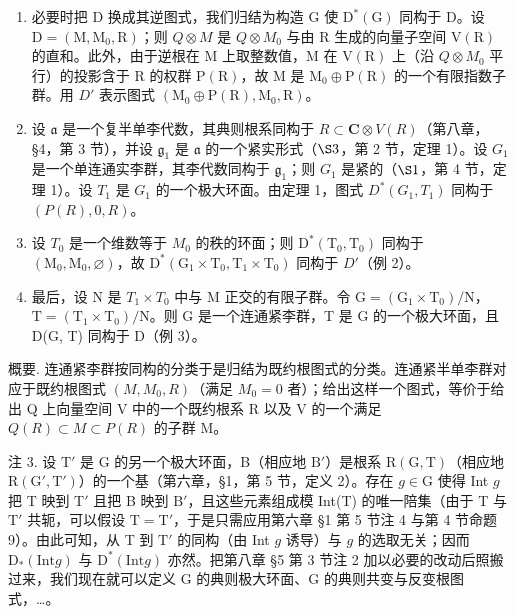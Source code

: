 \begin{enumerate}
\def\labelenumi{\alph{enumi})}
\item
  必要时把 D 换成其逆图式，我们归结为构造 G 使 \(\mathrm{D}^{*}(\mathrm{G})\) 同构于 D。设 \(\mathrm{D} = (\mathrm{M}, \mathrm{M}_{0}, \mathrm{R})\)；则 \(Q \otimes M\) 是 \(Q \otimes M_{0}\) 与由 R 生成的向量子空间 \(\mathrm{V}(\mathrm{R})\) 的直和。此外，由于逆根在 M 上取整数值，M 在 \(\mathrm{V}(\mathrm{R})\) 上（沿 \(Q \otimes M_{0}\) 平行）的投影含于 R 的权群 \(\mathrm{P}(\mathrm{R})\)，故 M 是 \(\mathrm{M}_{0} \oplus \mathrm{P}(\mathrm{R})\) 的一个有限指数子群。用 \(D'\) 表示图式 \((\mathrm{M}_{0} \oplus \mathrm{P}(\mathrm{R}), \mathrm{M}_{0}, \mathrm{R})\)。
\item
  设 \(\mathfrak{a}\) 是一个复半单李代数，其典则根系同构于 \(R \subset \mathbf{C} \otimes V(R)\)（第八章，§4，第 3 节），并设 \(\mathfrak{g}_1\) 是 \(\mathfrak{a}\) 的一个紧实形式（\(\S 3\)，第 2 节，定理 1）。设 \(G_1\) 是一个单连通实李群，其李代数同构于 \(\mathfrak{g}_1\)；则 \(G_1\) 是紧的（\(\S 1\)，第 4 节，定理 1）。设 \(T_1\) 是 \(G_1\) 的一个极大环面。由定理 1，图式 \(D^*(G_1, T_1)\) 同构于 \((P(R), 0, R)\)。
\item
  设 \(T_{0}\) 是一个维数等于 \(M_{0}\) 的秩的环面；则 \(\mathrm{D}^{*}(\mathrm{T}_{0},\mathrm{T}_{0})\) 同构于 \((\mathrm{M}_{0},\mathrm{M}_{0},\varnothing)\)，故 \(\mathrm{D}^{*}(\mathrm{G}_{1}\times\mathrm{T}_{0},\mathrm{T}_{1}\times\mathrm{T}_{0})\) 同构于 \(D'\)（例 2）。
\item
  最后，设 N 是 \(T_{1} \times T_{0}\) 中与 M 正交的有限子群。令 \(\mathrm{G} = (\mathrm{G}_{1} \times \mathrm{T}_{0})/\mathrm{N}\)，\(\mathrm{T} = (\mathrm{T}_{1} \times \mathrm{T}_{0})/\mathrm{N}\)。则 G 是一个连通紧李群，T 是 G 的一个极大环面，且 D(G, T) 同构于 D（例 3）。
\end{enumerate}

概要. 连通紧李群按同构的分类于是归结为既约根图式的分类。连通紧半单李群对应于既约根图式 \((M, M_{0}, R)\)（满足 \(M_{0} = 0\) 者）；给出这样一个图式，等价于给出 Q 上向量空间 V 中的一个既约根系 R 以及 V 的一个满足 \(Q(R) \subset M \subset P(R)\) 的子群 M。

注 3. 设 \(\mathrm{T}'\) 是 G 的另一个极大环面，B（相应地 \(\mathrm{B}'\)）是根系 \(\mathrm{R}(\mathrm{G},\mathrm{T})\)（相应地 \(\mathrm{R}(\mathrm{G}',\mathrm{T}')\)）的一个基（第六章，§1，第 5 节，定义 2）。存在 \(g\in \mathrm{G}\) 使得 Int \(g\) 把 T 映到 \(\mathrm{T}'\) 且把 B 映到 \(\mathrm{B}'\)，且这些元素组成模 Int(T) 的唯一陪集（由于 T 与 \(\mathrm{T}'\) 共轭，可以假设 \(\mathrm{T} = \mathrm{T}'\)，于是只需应用第六章 §1 第 5 节注 4 与第 4 节命题 9）。由此可知，从 T 到 \(\mathrm{T}'\) 的同构（由 Int \(g\) 诱导）与 \(g\) 的选取无关；因而 \(\mathrm{D}_{*}(\mathrm{Int}g)\) 与 \(\mathrm{D}^{*}(\mathrm{Int}g)\) 亦然。把第八章 §5 第 3 节注 2 加以必要的改动后照搬过来，我们现在就可以定义 G 的典则极大环面、G 的典则共变与反变根图式，\ldots。

